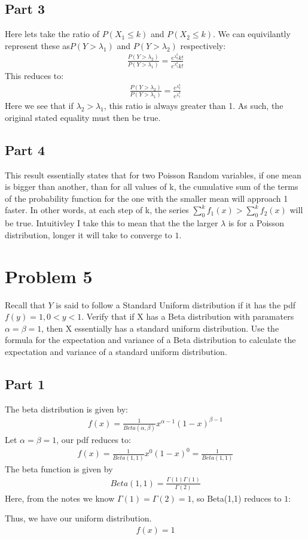 \documentclass{article}
\begin{document}
\subsection*{Part 3}
Here lets take the ratio of $P(X_1 \leq k)$ and $P(X_2 \leq k)$. We can equivilantly represent these as$P(Y>\lambda_1)$ and $P(Y> \lambda_2)$ respectively:
\begin{align*}
\frac{P(Y> \lambda_2)}{P(Y> \lambda_1)} = \frac{e^{\lambda_2^{k}}{k!}}{e^{\lambda_1^{k}}{k!}}
\end{align*}
This reduces to:
\begin{align*}
\frac{P(Y> \lambda_2)}{P(Y> \lambda_1)} = \frac{e^{\lambda_2^{k}}}{e^{\lambda_1^{k}}} 
\end{align*}
Here we see that if $\lambda_2 > \lambda_1$, this ratio is always greater than 1. As such, the original stated equality must then be true.

\subsection*{Part 4}

This result essentially states that for two Poisson Random variables, if one mean is bigger than another, than for all values of k, the cumulative sum of the terms of the probability function for the one with the smaller mean will approach 1 faster. In other words, at each step of k, the series $\sum_{0}^{k}f_1(x)>\sum_{0}^{k}f_2(x)$ will be true. Intuitivley I take this to mean that the the larger $\lambda$ is for a Poisson distribution, longer it will take to converge to $1$.

\clearpage
\section*{Problem 5}
Recall that $Y$ is said to follow a Standard Uniform distribution if it has the pdf $f(y)=1, 0<y<1$. Verify that if X has a Beta distribution with paramaters $\alpha = \beta = 1$, then X essentially has a standard uniform distribution. Use the formula for the expectation and variance of a Beta distribution to calculate the expectation and variance of a standard uniform distribution.
\subsection*{Part 1}
The beta distribution is given by:
\begin{align*}
f(x) = \frac{1}{Beta(\alpha, \beta)} x^{\alpha-1}(1-x)^{\beta-1}
\end{align*}
Let $\alpha=\beta=1$, our pdf reduces to:
\begin{align*}
f(x) = \frac{1}{Beta(1,1)} x^{0}(1-x)^{0} = \frac{1}{Beta(1,1)}
\end{align*}
The beta function is given by
\begin{align*}
Beta(1,1) = \frac{\Gamma(1)\Gamma(1)}{\Gamma(2)}
\end{align*}
Here, from the notes we know $\Gamma(1)=\Gamma(2)=1$, so Beta(1,1) reduces to $1$:

Thus, we have our uniform distribution.
\begin{align*}
\boxed{ f(x) = 1 }
\end{align*}
\end{document}
